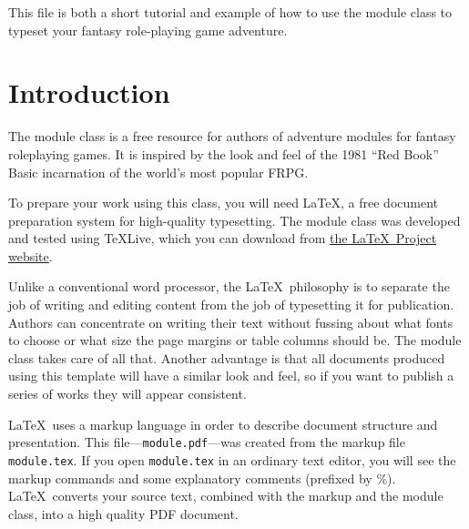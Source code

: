 \documentclass[letterpaper,serif]{module}
\begin{document}

\maketitle



%

\showtitle

This file is both a short tutorial and example of how to use the module class to typeset your fantasy role-playing game adventure.

\part{Introduction}

The module class is a free resource for authors of adventure modules for fantasy roleplaying games.
It is inspired by the look and feel of the 1981 ``Red Book'' Basic incarnation of the world's most popular FRPG.

To prepare your work using this class, you will need \LaTeX, a free document preparation system for high-quality
typesetting. The module class was developed and tested using \TeX Live, which you can download from
\href{https://latex-project.org/ftp.html}{the \LaTeX~Project website}.

Unlike a conventional word processor, the \LaTeX~philosophy is to separate the job of writing and editing content
from the job of typesetting it for publication. Authors can concentrate on writing their text without fussing
about what fonts to choose or what size the page margins or table columns should be. The module class takes care
of all that. Another advantage is that all documents produced using this template will have a similar look and
feel, so if you want to publish a series of works they will appear consistent.

\LaTeX~uses a markup language in order to describe document structure and presentation. This
file---\verb|module.pdf|---was created from the markup file \verb|module.tex|. If you open \verb|module.tex|
in an ordinary text editor, you will see the markup commands and some explanatory comments (prefixed by \%).
\LaTeX~converts your source text, combined with the markup and the module class, into a high quality PDF document.
\end{document}

